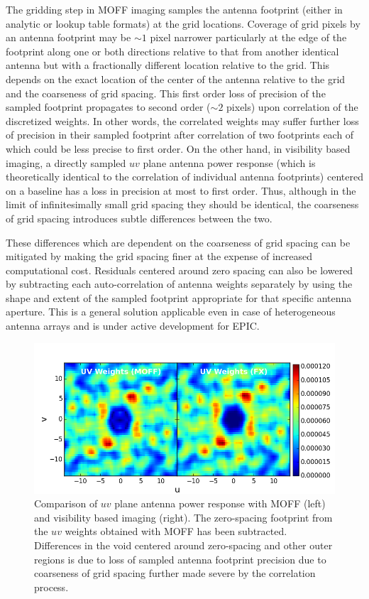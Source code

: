 \documentclass[a4paper,fleqn,usenatbib]{mnras}
\begin{document}
The gridding step in MOFF imaging samples the antenna footprint (either in 
analytic or lookup table formats) at the grid locations. Coverage of grid pixels 
by an antenna footprint may be $\sim 1$ pixel narrower particularly at the 
edge of the footprint along one or both directions relative to that from another 
identical antenna but with a fractionally different location relative to the 
grid. This depends on the exact location of the center of the antenna relative 
to the grid and the coarseness of grid spacing. This first order loss of 
precision of the sampled footprint propagates to second order ($\sim 2$ pixels) 
upon correlation of the discretized weights. In other words, the correlated 
weights may suffer further loss of precision in their sampled footprint after 
correlation of two footprints each of which could be less precise to first 
order. On the other hand, in visibility based imaging, a directly sampled $uv$ 
plane antenna power response (which is theoretically identical to the correlation 
of individual antenna footprints) centered on a baseline has a loss in precision 
at most to first order. Thus, although in the limit of infinitesimally small 
grid spacing they should be identical, the coarseness of grid spacing introduces 
subtle differences between the two.

These differences which are dependent on the coarseness of grid spacing can be 
mitigated by making the grid spacing finer at the expense of increased 
computational cost. Residuals centered around zero spacing can also be lowered 
by subtracting each auto-correlation of antenna weights separately by using the 
shape and extent of the sampled footprint appropriate for that specific antenna 
aperture. This is a general solution applicable even in case of heterogeneous 
antenna arrays and is under active development for EPIC.

\begin{figure}
  \includegraphics[width=\columnwidth]{MOFF_FX_comparison_uvwts_test_aperture_zero_spacing_removed}
  \caption{Comparison of $uv$ plane antenna power response with MOFF (left) and 
    visibility based imaging (right). The zero-spacing footprint from the $uv$ 
    weights obtained with MOFF has been subtracted. Differences in the void 
    centered around zero-spacing and other outer regions is due to loss of 
    sampled antenna footprint precision due to coarseness of grid spacing 
    further made severe by the correlation process.}
  \label{fig:MOFF-FX-uvwts}
\end{figure}
\end{document}
